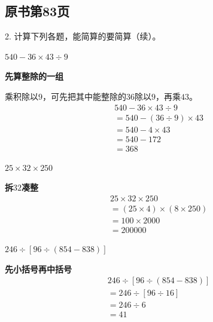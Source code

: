 

\subsection*{原书第83页}

2. 计算下列各题，能简算的要简算（续）。\par \(540-36\times43\div9\)\par
\begin{BookAnswer}
\textbf{先算整除的一组}\par 乘积除以\(9\)，可先把其中能整除的\(36\)除以\(9\)，再乘\(43\)。\[\begin{aligned}&540-36\times43\div9\\&=540-(36\div9)\times43\\&=540-4\times43\\&=540-172\\&=368\end{aligned}\]
\end{BookAnswer}

\(25\times32\times250\)\par
\begin{BookAnswer}
\textbf{拆\(32\)凑整}\[\begin{aligned}&25\times32\times250\\&=(25\times4)\times(8\times250)\\&=100\times2000\\&=200000\end{aligned}\]
\end{BookAnswer}

\(246\div[96\div(854-838)]\)\par
\begin{BookAnswer}
\textbf{先小括号再中括号}\[\begin{aligned}&246\div[96\div(854-838)]\\&=246\div[96\div16]\\&=246\div6\\&=41\end{aligned}\]
\end{BookAnswer}

